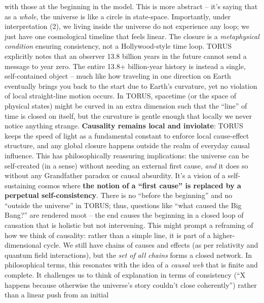\documentclass[
]{article}
\begin{document}
{\begin{itemize}
  with those at the beginning in the model\hspace{0pt}. This is more
  abstract -- it's saying that as a \emph{whole}, the universe is like a
  circle in state-space. Importantly, under interpretation (2), we
  living inside the universe do not experience any loop; we just have
  one cosmological timeline that feels linear. The closure is a
  \emph{metaphysical condition} ensuring consistency, not a
  Hollywood-style time loop. TORUS explicitly notes that an observer
  13.8 billion years in the future cannot send a message to year
  zero\hspace{0pt}. The entire 13.8+ billion-year history is instead a
  single, self-contained object -- much like how traveling in one
  direction on Earth eventually brings you back to the start due to
  Earth's curvature, yet no violation of local straight-line motion
  occurs. In TORUS, spacetime (or the space of physical states) might be
  curved in an extra dimension such that the ``line'' of time is closed
  on itself, but the curvature is gentle enough that locally we never
  notice anything strange. \textbf{Causality remains local and
  inviolate}: TORUS keeps the speed of light as a fundamental constant
  to enforce local cause-effect structure\hspace{0pt}, and any global
  closure happens outside the realm of everyday causal influence. This
  has philosophically reassuring implications: the universe can be
  self-created (in a sense) without needing an external first cause,
  \emph{and} it does so without any Grandfather paradox or causal
  absurdity. It's a vision of a self-sustaining cosmos where \textbf{the
  notion of a ``first cause'' is replaced by a perpetual
  self-consistency}. There is no ``before the beginning'' and no
  ``outside the universe'' in TORUS\hspace{0pt}; thus, questions like
  ``what caused the Big Bang?'' are rendered moot -- the end causes the
  beginning in a closed loop of causation that is holistic but not
  intervening. This might prompt a reframing of how we think of
  causality: rather than a simple line, it is part of a
  higher-dimensional cycle. We still have chains of causes and effects
  (as per relativity and quantum field interactions), but the \emph{set
  of all chains} forms a closed network. In philosophical terms, this
  resonates with the idea of a \emph{causal web} that is finite and
  complete. It challenges us to think of explanation in terms of
  consistency (``X happens because otherwise the universe's story
  couldn't close coherently'') rather than a linear push from an initial

\end{itemize}}
\end{document}
